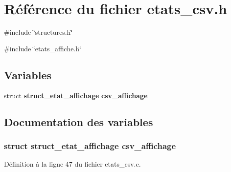 \section{Référence du fichier etats\_\-csv.h}
\label{etats__csv_8h}
{\ttfamily \#include \char`\"{}structures.h\char`\"{}}\par
{\ttfamily \#include \char`\"{}etats\_\-affiche.h\char`\"{}}\par
\subsection*{Variables}
\begin{DoxyCompactItemize}
\item 
struct {\bf struct\_\-etat\_\-affichage} {\bf csv\_\-affichage}
\end{DoxyCompactItemize}


\subsection{Documentation des variables}
\subsubsection[{csv\_\-affichage}]{\setlength{\rightskip}{0pt plus 5cm}struct {\bf struct\_\-etat\_\-affichage} {\bf csv\_\-affichage}}\label{etats__csv_8h_a121b891fb05ffbd94cb74962dd89abd9}


Définition à la ligne 47 du fichier etats\_\-csv.c.


